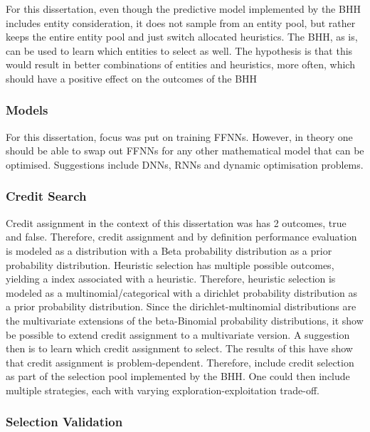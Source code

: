For this dissertation, even though the predictive model implemented by the \ac{BHH} includes entity consideration, it does not sample from an entity pool, but rather keeps the entire entity pool and just switch allocated heuristics. The \ac{BHH}, as is, can be used to learn which entities to select as well. The hypothesis is that this would result in better combinations of entities and heuristics, more often, which should have a positive effect on the outcomes of the \ac{BHH}

\subsubsection{Models}

For this dissertation, focus was put on training \acp{FFNN}. However, in theory one should be able to swap out \acp{FFNN} for any other mathematical model that can be optimised. Suggestions include \acp{DNN}, \acp{RNN} and dynamic optimisation problems.

\subsubsection{Credit Search}

Credit assignment in the context of this dissertation was has 2 outcomes, true and false. Therefore, credit assignment and by definition performance evaluation is modeled as a  distribution with a Beta probability distribution as a prior probability distribution. Heuristic selection has multiple possible outcomes, yielding a index associated with a heuristic. Therefore, heuristic selection is modeled as a multinomial/categorical with a dirichlet probability distribution as a prior probability distribution. Since the dirichlet-multinomial distributions are the multivariate extensions of the beta-Binomial probability distributions, it show be possible to extend credit assignment to a multivariate version. A suggestion then is to learn which credit assignment to select. The results of this have show that credit assignment is problem-dependent. Therefore, include credit selection as part of the selection pool implemented by the \ac{BHH}. One could then include multiple strategies, each with varying exploration-exploitation trade-off.

\subsubsection{Selection Validation}

